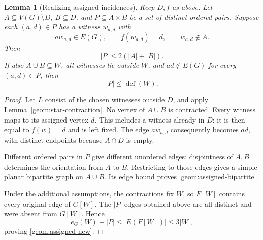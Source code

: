 \documentclass[11pt,a4paper]{article}
\newtheorem{lemma}[lemma]{Lemma}
\theoremstyle{definition}
\theoremstyle{remark}
\DeclareMathOperator{\Def}{def}
\begin{document}
\begin{lemma}[Realizing assigned incidences]\label{geom:assigned-incidences}
Keep $D,f$ as above. Let $A\subseteq V(G)\setminus D$, $B\subseteq D$,
and $P\subseteq A\times B$ be a set of distinct ordered pairs. Suppose
each $(a,d)\in P$ has a witness $w_{a,d}$ with
\[
 aw_{a,d}\in E(G),\qquad f(w_{a,d})=d,\qquad w_{a,d}\notin A.
\]
Then
\begin{equation}\label{geom:assigned-bipartite}
 |P|\leq2(|A|+|B|).
\end{equation}
If also $A\cup B\subseteq W$, all witnesses lie outside $W$, and
$ad\notin E(G)$ for every $(a,d)\in P$, then
\begin{equation}\label{geom:assigned-new}
 |P|\leq\Def(W).
\end{equation}
\end{lemma}
\begin{proof}
Let $L$ consist of the chosen witnesses outside $D$, and apply
Lemma~\ref{geom:star-contraction}. No vertex of $A\cup B$ is contracted.
Every witness maps to its assigned vertex $d$. This includes a witness
already in $D$: it is then equal to $f(w)=d$ and is left fixed.
The edge $aw_{a,d}$ consequently becomes $ad$, with distinct endpoints
because $A\cap D$ is empty.

Different ordered pairs in $P$ give different unordered edges: disjointness
of $A,B$ determines the orientation from $A$ to $B$. Restricting to those
edges gives a simple planar bipartite graph on $A\cup B$. Its edge bound
proves \eqref{geom:assigned-bipartite}.

Under the additional assumptions, the contractions fix $W$, so $F[W]$
contains every original edge of $G[W]$. The $|P|$ edges obtained above are
all distinct and were absent from $G[W]$. Hence
\[
 e_G(W)+|P|\leq |E(F[W])|\leq3|W|,
\]
proving \eqref{geom:assigned-new}.
\end{proof}
\end{document}
